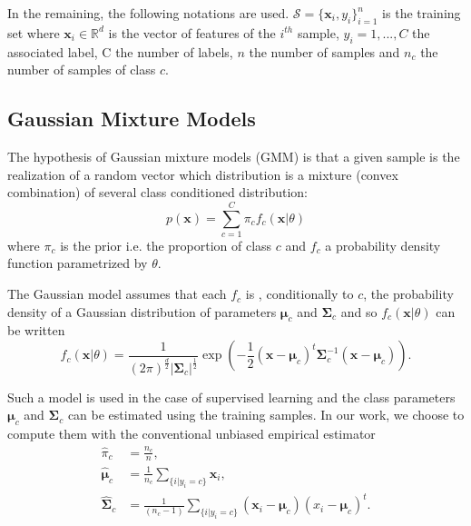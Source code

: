 \documentclass[a4paper,11pt,DIV=16,abstracton]{scrartcl}
\begin{document}
In the remaining, the following notations are used. $\mathcal{S} = \{\mathbf{x}_i,y_i\}_{i=1}^{n}$ is the training set where $\mathbf{x}_i \in \mathbb{R}^d$ is the vector of features of the $i^{th}$ sample, $y_i = 1,...,C$ the associated label, C the number of labels, $n$ the number of samples and $n_c$ the number of samples of class $c$.

    \subsection{Gaussian Mixture Models}

    The hypothesis of Gaussian mixture models (GMM) is that a given sample is the realization of a random vector which distribution is a mixture (convex combination) of several class conditioned distribution:
    \begin{equation}
        p(\mathbf{x}) = \sum_{c=1}^{C} \pi_c f_c(\mathbf{x}|\theta)
    \end{equation}
    where $\pi_c$ is the prior i.e. the proportion of class $c$ and $f_c$ a probability density function parametrized by $\theta$.

    The Gaussian model assumes that each $f_c$ is , conditionally to $c$, the probability density of a Gaussian distribution of parameters $\boldsymbol{\mu}_c$ and $\boldsymbol{\Sigma}_c$ and so $f_c(\mathbf{x}|\theta)$ can be written
    \begin{equation*}
        f_c(\mathbf{x}|\theta) = \frac{1}{(2\pi)^{\frac{d}{2}} |\boldsymbol{\Sigma}_c|^{\frac{1}{2}}} \exp \left( -\frac{1}{2} (\mathbf{x} - \boldsymbol{\mu}_c)^t \boldsymbol{\Sigma}_c^{-1} (\mathbf{x} - \boldsymbol{\mu}_c) \right).
    \end{equation*}

    Such a model is used in the case of supervised learning and the class parameters $\boldsymbol{\mu}_c$ and $\boldsymbol{\Sigma}_c$ can be estimated using the training samples. In our work, we choose to compute them with the conventional unbiased empirical estimator
    \begin{align}
        \hat{\pi}_c &= \frac{n_c}{n},\\
        \hat{\boldsymbol{\mu}}_c &= \frac{1}{n_c} \sum_{\{i|y_i = c\}} \mathbf{x}_i ,\\
        \hat{\boldsymbol{\Sigma}}_c &= \frac{1}{(n_c - 1)} \sum_{\{i|y_i = c\}} (\mathbf{x}_i - \boldsymbol{\mu}_c) (\boldsymbol{}x_i - \boldsymbol{\mu}_c)^t.
    \end{align}
\end{document}
